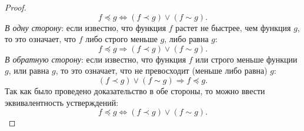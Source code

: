 \begin{enumerate}
\begin{enumerate}
\begin{proof}
        \begin{equation}
          f \preceq g \Leftrightarrow (f \prec g) \lor (f \sim g).
        \end{equation}
        \textit{В одну сторону}: если известно, что функция $f$ растет не быстрее, чем функция $g$, то это означает, что $f$ либо строго меньше $g$, либо равна $g$:
        \begin{equation}
          f \preceq g \Rightarrow (f \prec g) \lor (f \sim g).
        \end{equation}
        \textit{В обратную сторону}: если известно, что функция $f$ или строго меньше функции $g$, или равна $g$, то это означает, что не превосходит (меньше либо равна) $g$:
        \begin{equation}
          (f \prec g) \lor (f \sim g) \Rightarrow f \preceq g.
        \end{equation}
        Так как было проведено доказательство в обе стороны, то можно ввести эквивалентность устверждений:
        \begin{equation}
          f \preceq g \Leftrightarrow (f \prec g) \lor (f \sim g).
        \end{equation}
      \end{proof}
    \end{enumerate}


\end{enumerate}
